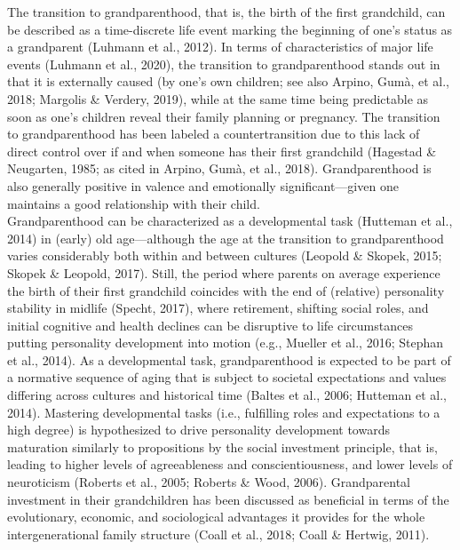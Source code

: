 \documentclass[
  english,
  man, noextraspace]{apa7}
\begin{document}
The transition to grandparenthood, that is, the birth of the first grandchild, can be described as a time-discrete life event marking the beginning of one's status as a grandparent (Luhmann et al., 2012). In terms of characteristics of major life events (Luhmann et al., 2020), the transition to grandparenthood stands out in that it is externally caused (by one's own children; see also Arpino, Gumà, et al., 2018; Margolis \& Verdery, 2019), while at the same time being predictable as soon as one's children reveal their family planning or pregnancy. The transition to grandparenthood has been labeled a countertransition due to this lack of direct control over if and when someone has their first grandchild (Hagestad \& Neugarten, 1985; as cited in Arpino, Gumà, et al., 2018). Grandparenthood is also generally positive in valence and emotionally significant---given one maintains a good relationship with their child.\\
Grandparenthood can be characterized as a developmental task (Hutteman et al., 2014) in (early) old age---although the age at the transition to grandparenthood varies considerably both within and between cultures (Leopold \& Skopek, 2015; Skopek \& Leopold, 2017). Still, the period where parents on average experience the birth of their first grandchild coincides with the end of (relative) personality stability in midlife (Specht, 2017), where retirement, shifting social roles, and initial cognitive and health declines can be disruptive to life circumstances putting personality development into motion (e.g., Mueller et al., 2016; Stephan et al., 2014). As a developmental task, grandparenthood is expected to be part of a normative sequence of aging that is subject to societal expectations and values differing across cultures and historical time (Baltes et al., 2006; Hutteman et al., 2014). Mastering developmental tasks (i.e., fulfilling roles and expectations to a high degree) is hypothesized to drive personality development towards maturation similarly to propositions by the social investment principle, that is, leading to higher levels of agreeableness and conscientiousness, and lower levels of neuroticism (Roberts et al., 2005; Roberts \& Wood, 2006). Grandparental investment in their grandchildren has been discussed as beneficial in terms of the evolutionary, economic, and sociological advantages it provides for the whole intergenerational family structure (Coall et al., 2018; Coall \& Hertwig, 2011).\\
\end{document}
